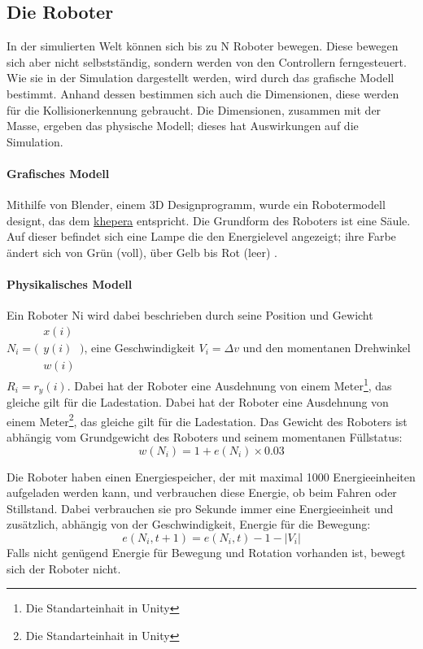 \subsection{Die Roboter}\label{robot}
In der simulierten Welt k{\"{o}}nnen sich bis zu \gls{N} Roboter bewegen. Diese bewegen sich aber nicht selbstst{\"{a}}ndig, sondern werden von den Controllern ferngesteuert.
Wie sie in der Simulation dargestellt werden, wird durch das grafische Modell bestimmt. Anhand dessen bestimmen sich auch die Dimensionen, diese werden f{\"{u}}r die Kollisionerkennung
gebraucht. Die Dimensionen, zusammen mit der Masse, ergeben das physische Modell; dieses hat Auswirkungen auf die Simulation.

\paragraph{Grafisches Modell} Mithilfe von Blender, einem 3D Designprogramm, wurde ein Robotermodell designt, das dem \hyperref[Kepheraroboter]{khepera} entspricht. Die Grundform des Roboters ist
eine S{\"{a}}ule. Auf dieser befindet sich eine Lampe die den Energielevel angezeigt; ihre Farbe {\"{a}}ndert sich von Gr{\"{u}}n (voll), {\"{u}}ber Gelb bis Rot (leer) .


\paragraph{Physikalisches Modell}
Ein Roboter \gls{Ni} wird dabei beschrieben durch seine Position und Gewicht
$ N_i = \bigl(\begin{smallmatrix} x(i) \\ y(i) \\ w(i) \end{smallmatrix}\bigr)$, eine
Geschwindigkeit $ V_i = \Delta v $ und den momentanen Drehwinkel
$ R_i = r_y(i)$. Dabei hat der Roboter eine Ausdehnung von einem Meter\footnote{Die Standarteinhait in Unity},
das gleiche gilt f{\"{u}}r die Ladestation.
Dabei hat der Roboter eine Ausdehnung von einem Meter\footnote{Die Standarteinhait in Unity},
das gleiche gilt f{\"{u}}r die Ladestation.
Das Gewicht des Roboters ist abh{\"{a}}ngig vom Grundgewicht des Roboters und seinem momentanen F{\"{u}}llstatus: 
\begin{equation}\label{eq:w}
 w(N_i) = 1 + e(N_i) \times 0.03
\end{equation}

Die Roboter haben einen Energiespeicher, der mit maximal 1000 Energieeinheiten
aufgeladen werden kann, und verbrauchen diese Energie, ob beim Fahren oder
Stillstand. Dabei verbrauchen sie pro Sekunde immer eine Energieeinheit und zus{\"{a}}tzlich, abh{\"{a}}ngig von der Geschwindigkeit, Energie f{\"{u}}r die Bewegung:
\begin{equation}\label{eq:entladen}
	e(N_i, t + 1) = e(N_i, t) - 1 - |V_i|
\end{equation}
Falls nicht gen{\"{u}}gend Energie f{\"{u}}r Bewegung und Rotation vorhanden ist, bewegt sich der Roboter nicht.

